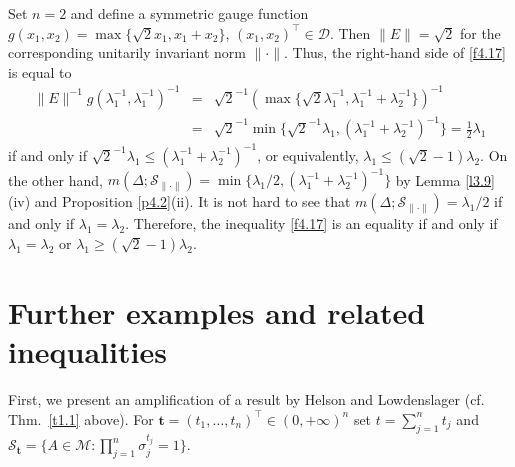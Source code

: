 \documentclass{amsart}
\begin{document}
\begin{exe} \label{e4.10}
Set $n=2$ and define a symmetric gauge function $g(x_1,x_2)= \max \{ \sqrt{2}x_1, x_1+x_2\}$,  $(x_1,x_2)^\top \in \mathcal D$. Then $\| E \| = \sqrt{2}$ for the corresponding unitarily invariant norm $\| \cdot \|$. Thus, the right-hand side of \eqref{f4.17} is equal to 
\begin{eqnarray*}
    \| E \|^{-1}g(\lambda_1^{-1},\lambda_1^{-1})^{-1} 
    & = & \sqrt{2}^{-1} (\max \{ \sqrt{2}\lambda_1^{-1}, \lambda_1^{-1}+\lambda_2^{-1}\} )^{-1} \\
    & = & \sqrt{2}^{-1} \min \{ \sqrt{2}^{-1} \lambda_1, (\lambda_1^{-1}+\lambda_2^{-1})^{-1} \} = \frac{1}{2} \lambda_1
\end{eqnarray*}
if and only if $\sqrt{2}^{-1} \lambda_1 \leq (\lambda_1^{-1}+\lambda_2^{-1})^{-1}$, or equivalently, $\lambda_1 \leq (\sqrt{2}-1) \lambda_2$. On the other hand, $m(\Delta ; {\mathcal S}_{\| \cdot \|}) = \min \{ \lambda_1 / 2, (\lambda_1^{-1}+\lambda_2^{-1})^{-1} \}$ by Lemma \ref{l3.9}(iv) and Proposition \ref{p4.2}(ii). It is not hard to see that $m(\Delta ; {\mathcal S}_{\| \cdot \|}) = \lambda_1/2$ if and only if $\lambda_1=\lambda_2$. Therefore, the inequality \eqref{f4.17} is an equality if and only if $\lambda_1=\lambda_2$ or $\lambda_1 \geq (\sqrt{2}-1) \lambda_2$.
\end{exe}


\section{Further examples and related inequalities}
\label{s5}

First, we present an amplification of a result by Helson and Lowdenslager \cite[Thm.~8]{HL} (cf. Thm.~\ref{t1.1} above). For ${\mathbf t}=(t_1,\ldots,t_n)^\top \in (0,+\infty)^n$ set $t = \sum_{j=1}^n t_j$ and ${\mathcal S}_{\mathbf t} = \{ A \in {\mathcal M} : \prod_{j=1}^n \sigma_j^{t_j} = 1 \}$. 
\end{document}
